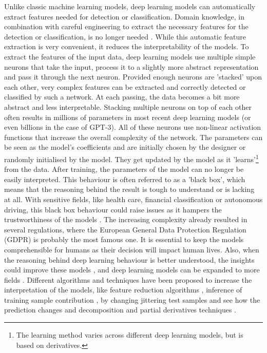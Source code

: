 \documentclass{article}
\begin{document}
Unlike classic machine learning models, deep learning models can automatically extract features needed for detection or classification.
Domain knowledge, in combination with careful engineering to extract the necessary features for the detection or classification, is no longer needed \autocite{lecun_deep_2015}.
While this automatic feature extraction is very convenient, it reduces the interpretability of the models.
To extract the features of the input data, deep learning models use multiple simple neurons that take the input, process it to a slightly more abstract representation and pass it through the next neuron.
Provided enough neurons are 'stacked' upon each other, very complex features can be extracted and correctly detected or classified by such a network.
At each passing, the data becomes a bit more abstract and less interpretable.
Stacking multiple neurons on top of each other often results in millions of parameters in most recent deep learning models (or even billions in the case of GPT-3).
All of these neurons use non-linear activation functions that increase the overall complexity of the network.
The parameters can be seen as the model's coefficients and are initially chosen by the designer or randomly initialised by the model.
They get updated by the model as it 'learns'\footnote{The learning method varies across different deep learning models, but is based on derivatives.} from the data.
After training, the parameters of the model can no longer be  easily interpreted.
This behaviour is often referred to as a 'black box', which means that the reasoning behind the result is tough to understand or is lacking at all.
With sensitive fields, like health care, financial classification or autonomous driving, this black box behaviour could raise issues as it hampers the trustworthiness of the models \autocite{carvalho_machine_2019}.
The increasing complexity already resulted in several regulations, where the European General Data Protection Regulation (GDPR) is probably the most famous one.
It is essential to keep the models comprehensible for humans as their decision will impact human lives.
Also, when the reasoning behind deep learning behaviour is better understood, the insights could improve these models \autocite{amershi_modeltracker_2015}, and deep learning models can be expanded to more fields \autocite{lei_opening_2018}.
Different algorithms and techniques have been proposed to increase the interpretation of the models, like feature reduction algorithms \autocite{ribeiro_why_2016}, inference of training sample contribution \autocite{koh_understanding_2020}, by changing jittering test samples and see how the prediction changes \autocite{li_understanding_2017} and decomposition and partial derivatives techniques \autocite{samek_explainable_2017}.
\end{document}
